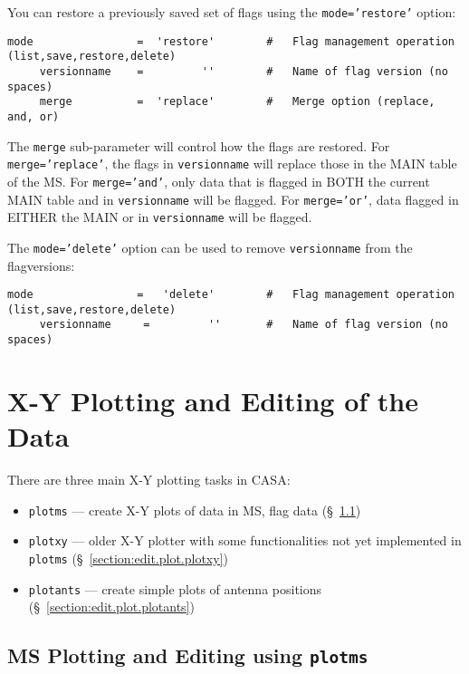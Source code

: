 You can restore a previously saved set of flags using the 
{\tt mode='restore'} option:
\small
\begin{verbatim}
mode                =  'restore'        #   Flag management operation (list,save,restore,delete)
     versionname    =         ''        #   Name of flag version (no spaces)
     merge          =  'replace'        #   Merge option (replace, and, or)
\end{verbatim}
\normalsize
The {\tt merge} sub-parameter will control how the flags are restored.  
For {\tt merge='replace'}, the flags in {\tt versionname} will replace those
in the MAIN table of the MS.  For {\tt merge='and'}, only data that is
flagged in BOTH the current MAIN table and in {\tt versionname} will 
be flagged.  For {\tt merge='or'}, data flagged in EITHER the MAIN or
in {\tt versionname} will be flagged.

The {\tt mode='delete'} option can be used to remove {\tt versionname} from the
flagversions:
\small
\begin{verbatim}
mode                =   'delete'        #   Flag management operation (list,save,restore,delete)
     versionname     =         ''       #   Name of flag version (no spaces)
\end{verbatim}
\normalsize

 

\section{X-Y Plotting and Editing of the Data}
\label{section:edit.plot}

There are three main X-Y plotting tasks in CASA:
\begin{itemize}
   \item {\tt plotms} --- create X-Y plots of data in MS, flag data
      (\S~\ref{section:edit.plot.plotms})
   \item {\tt plotxy} --- older X-Y plotter with some functionalities not yet implemented in {\tt plotms}
      (\S~\ref{section:edit.plot.plotxy})
   \item {\tt plotants} --- create simple plots of antenna positions
      (\S~\ref{section:edit.plot.plotants})
\end{itemize}

\subsection{MS Plotting and Editing using {\tt plotms}}
\label{section:edit.plot.plotms}

